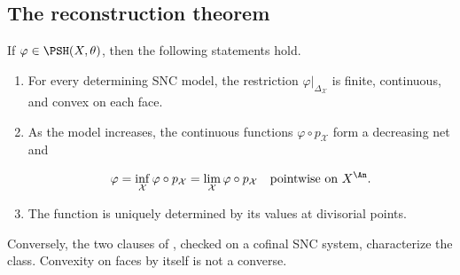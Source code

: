\subsection{The reconstruction theorem}
\label{sec:ch21-reconstruction}

\begin{theorem}\label{thm:bfj-skeletal-characterization}
If $\varphi\in\PSH(X,\theta)$, then the following statements hold.

\begin{enumerate}
\item For every determining SNC model, the restriction
$\varphi|_{\Delta_{\mathcal X}}$ is finite, continuous, and convex on
each face.
\item As the model increases, the continuous functions
$\varphi\circ p_{\mathcal X}$ form a decreasing net and

\begin{equation}
\label{eq:ch21-skeletal-reconstruction}
              \varphi
              =\inf_{\mathcal X}\varphi\circ p_{\mathcal X}
              =\lim_{\mathcal X}\varphi\circ p_{\mathcal X}
              \quad\text{pointwise on }X^{\An}.
\end{equation}

\item The function is uniquely determined by its values at divisorial
points.
\end{enumerate}

Conversely, the two clauses of , checked on a
cofinal SNC system, characterize the class.  Convexity on faces by itself is
not a converse.
\end{theorem}

